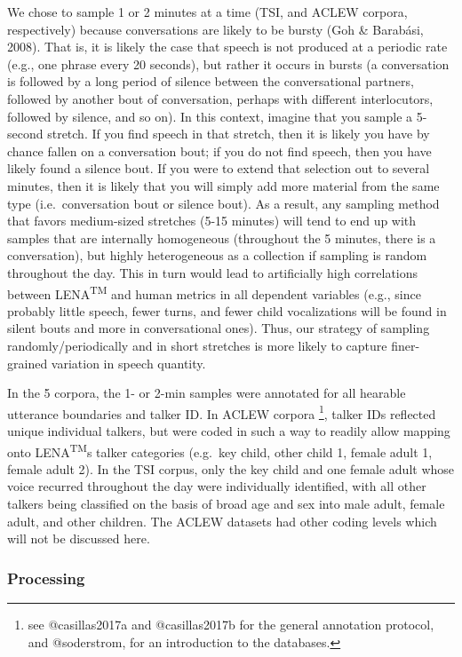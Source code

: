 \documentclass[english,floatsintext,man]{apa6}
\begin{document}
We chose to sample 1 or 2 minutes at a time (TSI, and ACLEW corpora,
respectively) because conversations are likely to be bursty (Goh \&
Barabási, 2008). That is, it is likely the case that speech is not
produced at a periodic rate (e.g., one phrase every 20 seconds), but
rather it occurs in bursts (a conversation is followed by a long period
of silence between the conversational partners, followed by another bout
of conversation, perhaps with different interlocutors, followed by
silence, and so on). In this context, imagine that you sample a 5-second
stretch. If you find speech in that stretch, then it is likely you have
by chance fallen on a conversation bout; if you do not find speech, then
you have likely found a silence bout. If you were to extend that
selection out to several minutes, then it is likely that you will simply
add more material from the same type (i.e.~conversation bout or silence
bout). As a result, any sampling method that favors medium-sized
stretches (5-15 minutes) will tend to end up with samples that are
internally homogeneous (throughout the 5 minutes, there is a
conversation), but highly heterogeneous as a collection if sampling is
random throughout the day. This in turn would lead to artificially high
correlations between LENA\textsuperscript{TM} and human metrics in all
dependent variables (e.g., since probably little speech, fewer turns,
and fewer child vocalizations will be found in silent bouts and more in
conversational ones). Thus, our strategy of sampling
randomly/periodically and in short stretches is more likely to capture
finer-grained variation in speech quantity.

In the 5 corpora, the 1- or 2-min samples were annotated for all
hearable utterance boundaries and talker ID. In ACLEW corpora
\footnote{see @casillas2017a and  @casillas2017b for the general annotation protocol, and @soderstrom, for an introduction to the databases.},
talker IDs reflected unique individual talkers, but were coded in such a
way to readily allow mapping onto LENA\textsuperscript{TM}s talker
categories (e.g.~key child, other child 1, female adult 1, female adult
2). In the TSI corpus, only the key child and one female adult whose
voice recurred throughout the day were individually identified, with all
other talkers being classified on the basis of broad age and sex into
male adult, female adult, and other children. The ACLEW datasets had
other coding levels which will not be discussed here.

\subsubsection{Processing}\label{processing}
\end{document}
